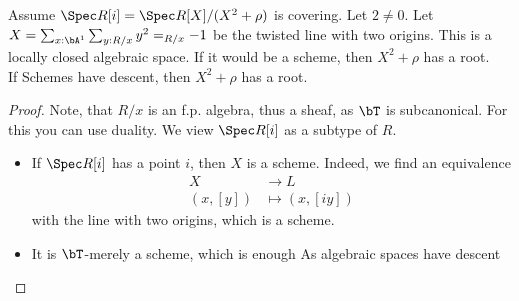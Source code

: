 \begin{lemma}[TODO]
	Assume $\Spec R[i] = \Spec  R[X] / (X^2 + \rho)$ is covering.
	Let $2 \neq 0$. Let $X = \sum_{x : \bA^1} \sum_{y : R / x} y^2 =_{R/x} -1$ be the twisted line with two origins. This is a locally closed algebraic space. If it would be a scheme, then $X^2 + \rho$ has a root. \\
	If Schemes have descent, then $X^2 + \rho$ has a root.
\end{lemma}
\begin{proof}
	Note, that $R / x$ is an f.p. algebra, thus a sheaf, as $\bT$ is subcanonical. For this you can use duality.
	We view $\Spec R[i]$ as a subtype of $R$.
	\begin{itemize}
		\item If $\Spec R[i]$ has a point $i$, then $X$ is a scheme. 
		Indeed, we find an equivalence
		\begin{align*}
			X &\to L \\
			(x,[y]) &\mapsto (x,[iy])
		\end{align*}
		with the line with two origins, which is a scheme.
		\item It is $\bT$-merely a scheme, which is enough As algebraic spaces have descent %

\end{itemize}
\end{proof}
